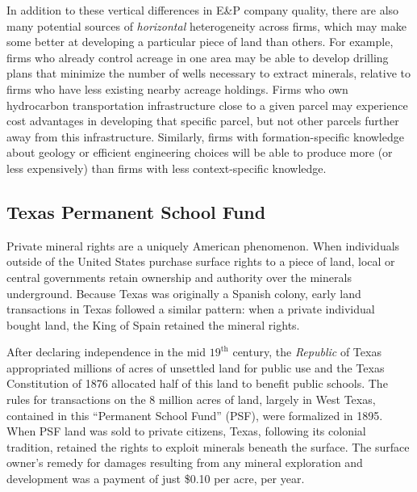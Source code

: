 \documentclass[12pt]{article}
\begin{document}
In addition to these vertical differences in E\&P company quality, there are also many potential sources of \textit{horizontal} heterogeneity across firms, which may make some better at developing a particular piece of land than others.  For example, firms who already control acreage in one area may be able to develop drilling plans that minimize the number of wells necessary to extract minerals, relative to firms who have less existing nearby acreage holdings.  Firms who own hydrocarbon transportation infrastructure close to a given parcel may experience cost advantages in developing that specific parcel, but not other parcels further away from this infrastructure.  Similarly, firms with formation-specific knowledge about geology or efficient engineering choices will be able to produce more (or less expensively) than firms with less context-specific knowledge.

\subsection{Texas Permanent School Fund \label{sec:PSF}}

Private mineral rights are a uniquely American phenomenon. When individuals outside of the United States purchase surface rights to a piece of land, local or central governments retain ownership and authority over the minerals underground. Because Texas was originally a Spanish colony, early land transactions in Texas followed a similar pattern: when a private individual bought land, the King of Spain retained the mineral rights. 

After declaring independence in the mid $19^{\text{th}}$ century, the \textit{Republic} of Texas appropriated millions of acres of unsettled land for public use and the Texas Constitution of 1876 allocated half of this land to benefit public schools. The rules for transactions on the 8 million acres of land, largely in West Texas, contained in this ``Permanent School Fund'' (PSF), were formalized in 1895.  When PSF land was sold to private citizens, Texas, following its colonial tradition, retained the rights to exploit minerals beneath the surface. The surface owner's remedy for damages resulting from any mineral exploration and development was a payment of just \$0.10 per acre, per year. 
\end{document}
